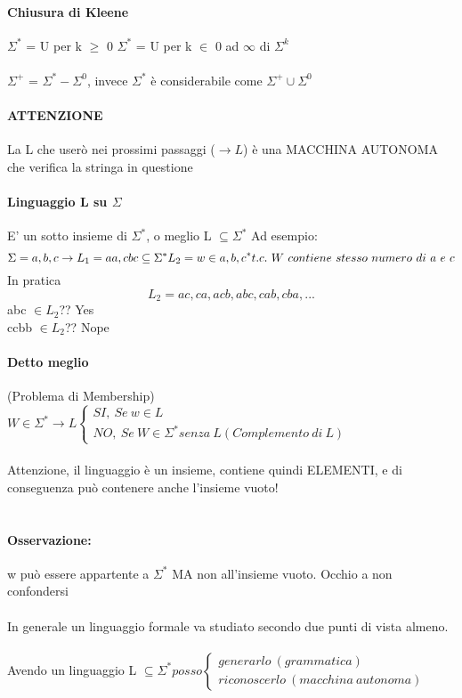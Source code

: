 \documentclass[12pt, a4paper, openany, oneside]{book}
\begin{document}
\paragraph{Chiusura di Kleene}
$\Sigma ^{*}$ = U per k $\geq$ 0 $\Sigma ^{*}$ = U per k $\in$ {0 ad $\infty$}
di $\Sigma ^{k}$
\\ \\
$\Sigma ^{+}$ = $\Sigma ^{*} - \Sigma ^{0}$, invece $\Sigma ^{*}$ è considerabile
come $\Sigma ^{+} \cup \Sigma ^{0}$
\paragraph{ATTENZIONE} La L che userò nei prossimi passaggi ($\to L$) è una MACCHINA 
AUTONOMA che verifica la stringa in questione
\paragraph{Linguaggio L su $\Sigma$}
E' un sotto insieme di $\Sigma ^{*}$, o meglio L  $\subseteq \Sigma ^{*}$ 
Ad esempio:
$$\Sigma = {a, b, c} \to L_{1}={aa, cbc}  \subseteq \Sigma ^{*} \\
L_{2} = {w \in {a,b,c}^{*} t.c. ~ W ~ contiene ~ stesso ~ numero~di~a~e~c} $$
In pratica
$$L_{2} = {ac, ca, acb, abc, cab, cba, ...}$$
abc $\in L_{2}$?? Yes\\
ccbb $\in L_{2}$?? Nope\\
\paragraph{Detto meglio} (Problema di Membership) \\ $W \in \Sigma ^{*} \to L 
\begin{cases}
SI, ~ Se ~ w \in L \\
NO, ~ Se ~ W \in \Sigma ^{*} senza ~ L (Complemento~di~L)
\end{cases}$ \\ \\
Attenzione, il linguaggio è un insieme, contiene quindi ELEMENTI, e di 
conseguenza può contenere anche l'insieme vuoto! \\ \\
\paragraph{Osservazione:} w può essere appartente a $\Sigma ^{*}$ MA non 
all'insieme vuoto. Occhio a non confondersi
\\ \\
In generale un linguaggio formale va studiato secondo due punti di vista almeno.
\\ \\
Avendo un linguaggio L  $\subseteq \Sigma ^{*} posso 
\begin{cases}
generarlo ~(grammatica)\\
riconoscerlo ~(macchina~autonoma)
\end{cases}$
\end{document}
